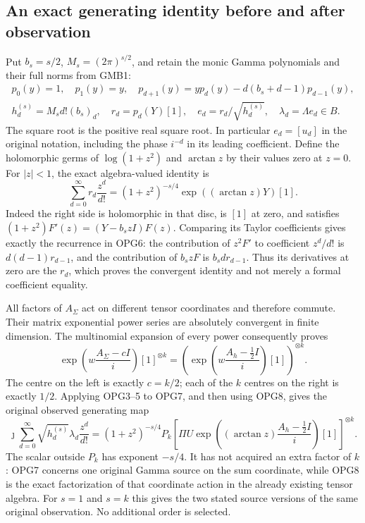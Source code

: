 \documentclass[11pt,a4paper]{article}
\begin{document}
\subsection{An exact generating identity before and after observation}
Put $b_s=s/2$, $M_s=(2\pi)^{s/2}$, and retain the monic Gamma
polynomials and their full norms from GMB1:
\[
\begin{gathered}
 p_0(y)=1,\quad p_1(y)=y,\quad
 p_{d+1}(y)=yp_d(y)-d(b_s+d-1)p_{d-1}(y),\\
 h_d^{(s)}=M_s d!(b_s)_d,\quad
 r_d=p_d(Y)[1],\quad e_d=r_d/\sqrt{h_d^{(s)}},\quad
 \lambda_d=\Lambda e_d\in B.
\end{gathered}\tag{OPG6}
\]
The square root is the positive real square root. In particular
$e_d=[u_d]$ in the original notation, including the phase $i^{-d}$
in its leading coefficient. Define the holomorphic germs of
$\log(1+z^2)$ and $\arctan z$ by their values zero at $z=0$.
For $|z|<1$, the exact algebra-valued identity is
\[
 \sum_{d=0}^{\infty}r_d\frac{z^d}{d!}
 = (1+z^2)^{-s/4}\exp((\arctan z)Y)[1].
 \tag{OPG7}
\]
Indeed the right side is holomorphic in that disc, is $[1]$ at
zero, and satisfies
$(1+z^2)F'(z)=(Y-b_s zI)F(z)$.
Comparing its Taylor coefficients gives exactly the recurrence
in OPG6: the contribution of $z^2F'$ to coefficient $z^d/d!$
is $d(d-1)r_{d-1}$, and the contribution of $b_szF$ is
$b_sd r_{d-1}$. Thus its derivatives at zero are the $r_d$,
which proves the convergent identity and not merely a formal
coefficient equality.

All factors of $A_\Sigma$ act on different tensor coordinates
and therefore commute. Their matrix exponential power series
are absolutely convergent in finite dimension. The multinomial
expansion of every power consequently proves
\[
 \exp\left(w\frac{A_\Sigma-cI}{i}\right)[1]^{\otimes k}
 =\left(\exp\left(w\frac{A_h-\tfrac12I}{i}\right)[1]\right)^{\otimes k}.
 \tag{OPG8}
\]
The centre on the left is exactly $c=k/2$; each of the $k$
centres on the right is exactly $1/2$. Applying OPG3--5 to OPG7,
and then using OPG8, gives the original observed generating map
\[
\boxed{
 \jmath\sum_{d=0}^{\infty}\sqrt{h_d^{(s)}}\lambda_d\frac{z^d}{d!}
 = (1+z^2)^{-s/4}P_k
 \left[\Pi U\exp\left((\arctan z)
                \frac{A_h-\tfrac12I}{i}\right)[1]\right]^{\otimes k}.
}\tag{OPG9}
\]
The scalar outside $P_k$ has exponent $-s/4$. It has not acquired
an extra factor of $k$: OPG7 concerns one original Gamma source
on the sum coordinate, while OPG8 is the exact factorization of
that coordinate action in the already existing tensor algebra.
For $s=1$ and $s=k$ this gives the two stated source versions of
the same original observation. No additional order is selected.
\end{document}
